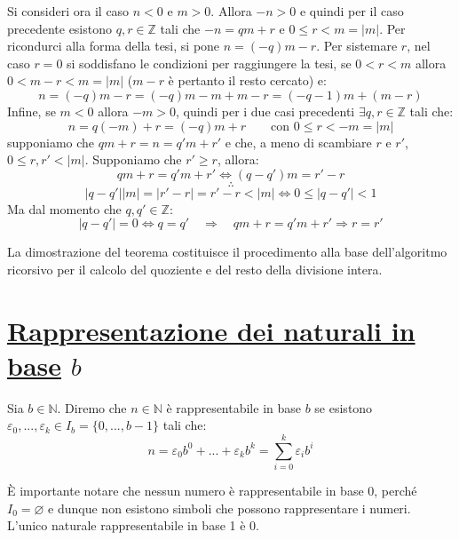 \begin{tcolorbox}[enhanced, breakable, title={Teorema della divisione euclidea}]
Si consideri ora il caso $n < 0$ e $m > 0$. Allora $-n > 0$ e quindi
per il caso precedente esistono $q,r \in \mathbb{Z}$ tali che
$-n = qm + r$ e $0 \leq r < m = |m|$. Per ricondurci alla forma della
tesi, si pone $n = (-q)m - r$. Per sistemare $r$, nel caso $r = 0$ si
soddisfano le condizioni per raggiungere la tesi, se $0 < r < m$ allora
$0 < m - r < m = |m|$ ($m - r$ è pertanto il resto cercato) e:
\[ n = (-q)m - r = (-q)m - m + m - r = (-q - 1)m + (m - r) \]
Infine, se $m < 0$ allora $-m > 0$, quindi per i due casi precedenti
$\exists q,r \in \mathbb{Z}$ tali che:
\[ n = q(-m) + r = (-q)m + r \qquad \text{con } 0 \leq r < -m = |m| \]
 supponiamo che
$qm + r = n = q'm + r'$ e che, a meno di scambiare $r$ e $r'$, $0 \leq r,r' < |m|$.
Supponiamo che $r' \geq r$, allora:
\[ qm + r = q'm + r' \Longleftrightarrow (q - q')m = r'-r \]
\[ \therefore \]
\[ |q-q'||m| = |r'-r| = r'-r < |m| \Longleftrightarrow 0 \leq |q-q'| < 1 \]
Ma dal momento che $q,q' \in \mathbb{Z}$:
\[
    |q-q'| = 0 \Longleftrightarrow q = q' \quad \Longrightarrow \quad qm + r = q'm + r' \Longrightarrow r = r'
\]

\cvd
\end{tcolorbox}

La dimostrazione del teorema costituisce il procedimento alla base
dell'algoritmo ricorsivo per il calcolo del quoziente e del resto
della divisione intera.
\begin{tcolorbox}[enhanced, breakable, colback=red!30, colframe=red!30!black, title=Algoritmo di divisione euclidea]

\end{tcolorbox}

\section{\underline{Rappresentazione dei naturali in base} $b$}
\begin{tcolorbox}[colback=yellow!30, colframe=yellow!30!black, title=Rappresentabilità dei naturali in base arbitraria]
Sia $b\in\mathbb{N}$. Diremo che $n\in\mathbb{N}$ è rappresentabile in base $b$ se
esistono $\varepsilon_0,...,\varepsilon_k\in I_b=\{0,...,b-1\}$ tali che:
\[ n=\varepsilon_0b^0+...+\varepsilon_k b^k = \sum_{i=0}^{k}\varepsilon_ib^i \]
\end{tcolorbox}

\begin{osservaz}
È importante notare che nessun numero è rappresentabile in base 0, perché
$I_0 = \varnothing$ e dunque non esistono simboli che possono rappresentare
i numeri. L'unico naturale rappresentabile in base 1 è 0.
\end{osservaz}

